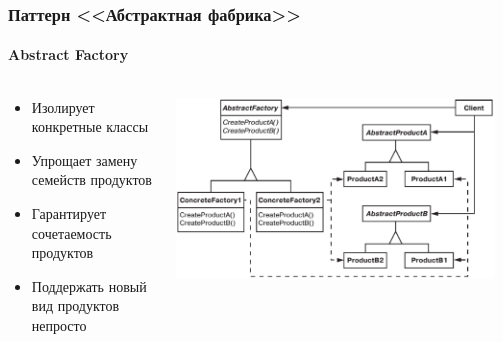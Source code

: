 \documentclass{../../slides-style}
\begin{document}
    \begin{frame}
        \frametitle{Паттерн <<Абстрактная фабрика>>}
        \framesubtitle{Abstract Factory}
        \begin{columns}
            \begin{column}{0.4\textwidth}
                \begin{itemize}
                    \item Изолирует конкретные классы
                    \item Упрощает замену семейств продуктов
                    \item Гарантирует сочетаемость продуктов
                    \item Поддержать новый вид продуктов непросто
                \end{itemize}
            \end{column}
            \begin{column}{0.6\textwidth}
                \begin{center}
                    \includegraphics[width=0.95\textwidth]{abstractFactory.png}
                \end{center}
            \end{column}
        \end{columns}
    \end{frame}
\end{document}
